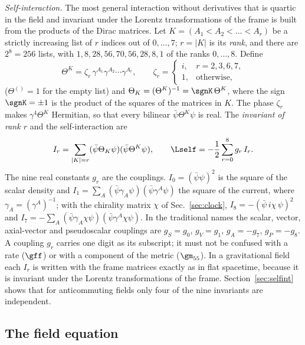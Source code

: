 \emph{Self-interaction.} The most general interaction without derivatives that is quartic in the
field and invariant under the Lorentz transformations of the frame is built from the products of
the Dirac matrices. Let $K=(A_1<A_2<\dots<A_r)$ be a strictly increasing list of $r$ indices out of
$0,\dots,7$; $r=|K|$ is its \emph{rank}, and there are $2^{8}=256$ lists, with
$1,8,28,56,70,56,28,8,1$ of the ranks $0,\dots,8$. Define
\begin{equation}
\Theta^{K}=\zeta_r\,\gamma^{A_1}\gamma^{A_2}\cdots\gamma^{A_r},\qquad
\zeta_r=\begin{cases}i,&r=2,3,6,7,\\1,&\text{otherwise},\end{cases}
\label{eq:Theta}
\end{equation}
($\Theta^{()}=1$ for the empty list) and $\Theta_K=(\Theta^{K})^{-1}=\sgnK\,\Theta^{K}$, where the
sign $\sgnK=\pm1$ is the product of the squares of the matrices in $K$. The phase $\zeta_r$ makes
$\gamma^{4}\Theta^{K}$ Hermitian, so that every bilinear $\bar\psi\Theta^{K}\psi$ is real. The
\emph{invariant of rank $r$} and the self-interaction are
\begin{equation}
I_r=\sum_{|K|=r}(\bar\psi\Theta_K\psi)(\bar\psi\Theta^{K}\psi),\qquad
\Lself=-\frac12\sum_{r=0}^{8}g_r\,I_r .
\label{eq:Lself}
\end{equation}
The nine real constants $g_r$ are the couplings. $I_0=(\bar\psi\psi)^{2}$ is the square of the scalar
density and $I_1=\sum_A(\bar\psi\gamma_{A}\psi)(\bar\psi\gamma^{A}\psi)$ the square of the current, where
$\gamma_A=(\gamma^{A})^{-1}$; with the chirality matrix $\chi$ of Sec.~\ref{sec:clock},
$I_8=-(\bar\psi\,i\chi\,\psi)^{2}$ and
$I_7=-\sum_A(\bar\psi\gamma_{A}\chi\psi)(\bar\psi\gamma^{A}\chi\psi)$. In the traditional names the scalar,
vector, axial-vector and pseudoscalar couplings are $g_S=g_0$, $g_V=g_1$, $g_A=-g_7$, $g_P=-g_8$. A
coupling $g_r$ carries one digit as its subscript; it must not be confused with a rate ($\gff$) or
with a component of the metric ($\gm_{55}$). In a gravitational field each $I_r$ is written with the
frame matrices exactly as in flat spacetime, because it is invariant under the Lorentz
transformations of the frame. Section~\ref{sec:selfint} shows that for anticommuting fields only
four of the nine invariants are independent.

\subsection{The field equation}

